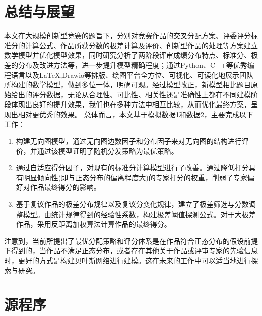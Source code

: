 \documentclass[bwprint]{gmcmthesis}
\begin{document}
\section{总结与展望 }
	本文在大规模创新型竞赛的题旨下，分别对竞赛作品的交叉分配方案、评委评分标准分的计算公式、作品所获分数的极差计算及评价、创新型作品的处理等方案建立数学模型并优化模型效果，同时研究分析了两阶段评审成绩分布特点、标准分、极差的分布及改进方法等，进一步提升模型精确程度；通过Python、C++等优秀编程语言以及LaTeX,Drawio等排版、绘图平台全方位、可视化、可读化地展示团队所构建的数学模型，做到多位一体，明确可观。经过模型改正，新模型相比题目原始给出的评分数据，无论从合理性、可比性、相关性还是准确性上都在不同建模阶段体现出良好的提升效果，我们也在多种方法中相互比较，从而优化最终方案，呈现出相对更优秀的效果。
	总体而言，本文基于模拟数据1和数据2，主要完成以下工作：
	\begin{enumerate}
	\item 构建无向图模型，通过无向图边数因子和分布因子来对无向图的结构进行评价，并通过该模型证明了随机分发策略为最优策略。
	\item 通过自适应得分因子，对现有的标准分计算模型进行了改善。通过降低打分具有明显倾向性(即与正态分布的偏离程度大)的专家打分的权重，削弱了专家偏好对作品最终得分的影响。
	\item 基于复议作品的极差分布规律以及复议分变化规律，建立了极差筛选与分数调整模型。由统计规律得到的经验性系数，构建极差阈值探测公式。对于大极差作品，采用反距离加权算法计算作品的最终得分。
	\end{enumerate}
	
	注意到，当前所提出了最优分配策略和评分体系是在作品符合正态分布的假设前提下得到的，当作品不满足正态分布，或者存在其他关于作品或评审专家的先验信息时，更好的方式是构建贝叶斯网络进行建模。这在未来的工作中可以适当地进行探索与研究。

\newpage






\newpage
\appendix
\section{源程序}
\end{document}
